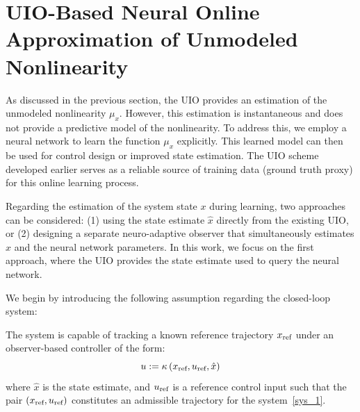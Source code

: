 
\section{UIO-Based Neural Online Approximation of Unmodeled Nonlinearity }\label{learning}
As discussed in the previous section, the UIO provides an estimation of the unmodeled nonlinearity $\mu_{x}$. However, this estimation is instantaneous and does not provide a predictive model of the nonlinearity. To address this, we employ a neural network to learn the function $\mu_{x}$ explicitly. This learned model can then be used for control design or improved state estimation. The UIO scheme developed earlier serves as a reliable source of training data (ground truth proxy) for this online learning process.

Regarding the estimation of the system state $x$ during learning, two approaches can be considered: (1) using the state estimate $\hat{x}$ directly from the existing UIO, or (2) designing a separate neuro-adaptive observer that simultaneously estimates $x$ and the neural network parameters. In this work, we focus on the first approach, where the UIO provides the state estimate used to query the neural network.

We begin by introducing the following assumption regarding the closed-loop system:
\begin{assumption}\label{huy_hyp1}
    The system is capable of tracking a known reference trajectory $x_{\text{ref}}$ under an observer-based controller of the form:
    \begin{equation}\label{control}
        u := \kappa\left(x_{\text{ref}}, u_{\text{ref}},\hat{x}\right)
    \end{equation}
    where $\hat{x}$ is the state estimate, and $u_{\text{ref}}$ is a reference control input such that the pair $\left(x_{\text{ref}}, u_{\text{ref}} \right)$ constitutes an admissible trajectory for the system~\eqref{sys_1}.
\end{assumption}

